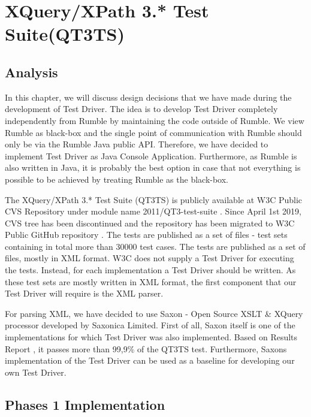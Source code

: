 \chapter{XQuery/XPath 3.* Test Suite(QT3TS)}
\section{Analysis}
In this chapter, we will discuss design decisions that we have made during the development of Test Driver. The idea is to develop Test Driver completely independently from Rumble by maintaining the code outside of Rumble. We view Rumble as black-box and the single point of communication with Rumble should only be via the Rumble Java public API. Therefore, we have decided to implement Test Driver as Java Console Application. Furthermore, as Rumble is also written in Java, it is probably the best option in case that not everything is possible to be achieved by treating Rumble as the black-box.

The XQuery/XPath 3.* Test Suite (QT3TS) is publicly available at W3C Public CVS Repository under module name 2011/QT3-test-suite \cite{TestSuiteCVSRepository}. Since April 1st 2019, CVS tree has been discontinued and the repository has been migrated to W3C Public GitHub repository \cite{TestSuiteGitHubRepository}. The tests are published as a set of files - test sets containing in total more than 30000 test cases. The tests are published as a set of files, mostly in XML format. W3C does not supply a Test Driver for executing the tests. Instead, for each implementation a Test Driver should be written. As these test sets are mostly written in XML format, the first component that our Test Driver will require is the XML parser. 

For parsing XML, we have decided to use Saxon \cite{Saxon} - Open Source XSLT \& XQuery processor developed by Saxonica Limited. First of all, Saxon itself is one of the implementations for which Test Driver was also implemented. Based on Results Report \cite{SaxonReport}, it passes more than 99,9\% of the QT3TS test. Furthermore, Saxons implementation of the Test Driver can be used as a baseline for developing our own Test Driver. 

\section{Phases 1 Implementation}

